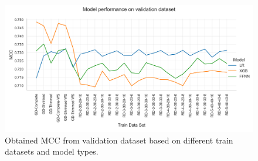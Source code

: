 \begin{figure}[ht]
    \centering
    \includegraphics[width =\textwidth]{pictures/feature_filter/validation_line_plot.png}
    \caption{Obtained MCC from validation dataset based on different train datasets and model types.}
    \label{fig:validation_performance_line_plot}
\end{figure}

